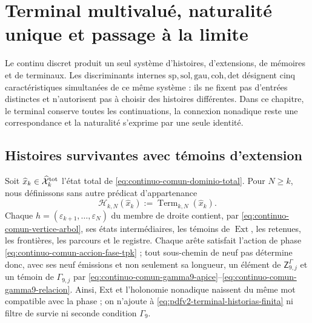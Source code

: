 \chapter[Terminal, naturalité et limite]{Terminal multivalué, naturalité unique et passage à la limite}
\label{chap:pdfv2-terminal-naturalidad-limite}

\begin{thesisbox}
Le continu discret produit un seul système d'histoires, d'extensions, de mémoires et de terminaux. Les discriminants internes \(\mathrm{sp},\mathrm{sol},\mathrm{gau},\mathrm{coh},\mathrm{det}\) désignent cinq caractéristiques simultanées de ce même système : ils ne fixent pas d'entrées distinctes et n'autorisent pas à choisir des histoires différentes. Dans ce chapitre, le terminal conserve toutes les continuations, la connexion nonadique reste une correspondance et la naturalité s'exprime par une seule identité.
\end{thesisbox}

\section{Histoires survivantes avec témoins d'extension}

Soit \(\widehat x_k\in\widehat{\mathcal X}^{\rm tot}_k\) l'état total de \eqref{eq:continuo-comun-dominio-total}. Pour \(N\geq k\), nous définissons sans autre prédicat d'appartenance
\begin{equation}
\label{eq:pdfv2-terminal-historias-finita}
 \mathscr H_{k,N}(\widehat x_k)
 :=\operatorname{Term}_{k,N}(\widehat x_k).
\end{equation}
Chaque \(h=(\varepsilon_{k+1},\ldots,\varepsilon_N)\) du membre de droite contient, par \eqref{eq:continuo-comun-vertice-arbol}, ses états intermédiaires, les témoins de \(\operatorname{Ext}\), les retenues, les frontières, les parcours et le registre. Chaque arête satisfait l'action de phase \eqref{eq:continuo-comun-accion-fase-tpk} ; tout sous-chemin de neuf pas détermine donc, avec ses neuf émissions et non seulement sa longueur, un élément de \(\mathsf Z^\Gamma_{9,j}\) et un témoin de \(\Gamma_{9,j}\) par \eqref{eq:continuo-comun-gamma9-apice}--\eqref{eq:continuo-comun-gamma9-relacion}. Ainsi, Ext et l'holonomie nonadique naissent du même mot compatible avec la phase ; on n'ajoute à \eqref{eq:pdfv2-terminal-historias-finita} ni filtre de survie ni seconde condition \(\Gamma_9\).

